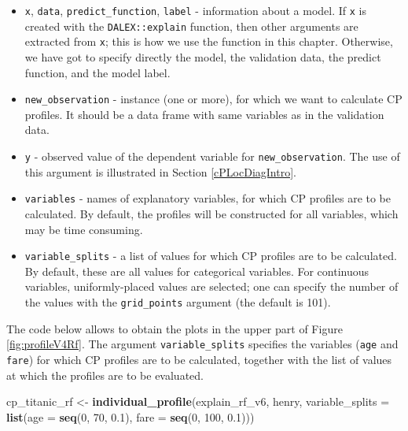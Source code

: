 \documentclass[]{krantz}
\newenvironment{Shaded}{\begin{snugshade}}{\end{snugshade}}
\newcommand{\DataTypeTok}[1]{\textcolor[rgb]{0.13,0.29,0.53}{#1}}
\newcommand{\DecValTok}[1]{\textcolor[rgb]{0.00,0.00,0.81}{#1}}
\newcommand{\FloatTok}[1]{\textcolor[rgb]{0.00,0.00,0.81}{#1}}
\newcommand{\KeywordTok}[1]{\textcolor[rgb]{0.13,0.29,0.53}{\textbf{#1}}}
\newcommand{\NormalTok}[1]{#1}
\newcommand{\StringTok}[1]{\textcolor[rgb]{0.31,0.60,0.02}{#1}}
\providecommand{\tightlist}{%
  \setlength{\itemsep}{0pt}\setlength{\parskip}{0pt}}
\begin{document}
\begin{itemize}
\tightlist
\item
  \texttt{x}, \texttt{data}, \texttt{predict\_function}, \texttt{label} - information about a model. If \texttt{x} is created with the \texttt{DALEX::explain} function, then other arguments are extracted from \texttt{x}; this is how we use the function in this chapter. Otherwise, we have got to specify directly the model, the validation data, the predict function, and the model label.
\item
  \texttt{new\_observation} - instance (one or more), for which we want to calculate CP profiles. It should be a data frame with same variables as in the validation data.
\item
  \texttt{y} - observed value of the dependent variable for \texttt{new\_observation}. The use of this argument is illustrated in Section \ref{cPLocDiagIntro}.
\item
  \texttt{variables} - names of explanatory variables, for which CP profiles are to be calculated. By default, the profiles will be constructed for all variables, which may be time consuming.
\item
  \texttt{variable\_splits} - a list of values for which CP profiles are to be calculated. By default, these are all values for categorical variables. For continuous variables, uniformly-placed values are selected; one can specify the number of the values with the \texttt{grid\_points} argument (the default is 101).
\end{itemize}

The code below allows to obtain the plots in the upper part of Figure \ref{fig:profileV4Rf}. The argument \texttt{variable\_splits} specifies the variables (\texttt{age} and \texttt{fare}) for which CP profiles are to be calculated, together with the list of values at which the profiles are to be evaluated.

\begin{Shaded}
\begin{Highlighting}[]
\NormalTok{cp_titanic_rf <-}\StringTok{ }\KeywordTok{individual_profile}\NormalTok{(explain_rf_v6, henry,}
              \DataTypeTok{variable_splits =} \KeywordTok{list}\NormalTok{(}\DataTypeTok{age =} \KeywordTok{seq}\NormalTok{(}\DecValTok{0}\NormalTok{, }\DecValTok{70}\NormalTok{, }\FloatTok{0.1}\NormalTok{),}
                                     \DataTypeTok{fare =} \KeywordTok{seq}\NormalTok{(}\DecValTok{0}\NormalTok{, }\DecValTok{100}\NormalTok{, }\FloatTok{0.1}\NormalTok{)))}
\end{Highlighting}
\end{Shaded}
\end{document}
